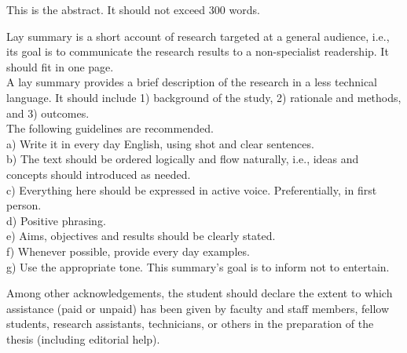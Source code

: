 \documentclass[12pt]{pdfathesis}
\begin{document}
\begin{prefatory}
\frontpage
\abstract%
This is the abstract. It should not exceed $300$ words.
\dedication%
{\flushright
To whom you what to dedicate this work\\
}
\laysummary %
Lay summary is a short account of research targeted at a general
audience, i.e., its goal is to communicate the research results to a
non-specialist readership. It should fit in one page.\\[12pt]%
A lay summary provides a brief description of the research in a less
technical language. It should include 1) background of the study, 2)
rationale and methods, and 3) outcomes.\\[12pt]%
The following guidelines are recommended.\\%
a) Write it in every day English, using shot and clear sentences.\\%
b) The text should be ordered logically and flow naturally, i.e.,
ideas and concepts should introduced as needed.\\%
c) Everything here should be expressed in active
voice. Preferentially, in first person.\\%
d) Positive phrasing.\\%
e) Aims, objectives and results should be clearly stated.\\%
f) Whenever possible, provide every day examples.\\%
g) Use the appropriate tone. This summary's goal is to inform not to
entertain.

\acknowledgements%
Among other acknowledgements, the student should declare the
extent to which assistance (paid or unpaid) has been given by faculty
and staff members, fellow students, research assistants, technicians,
or others in the preparation of the thesis (including editorial help).\\


\end{prefatory}
\end{document}
